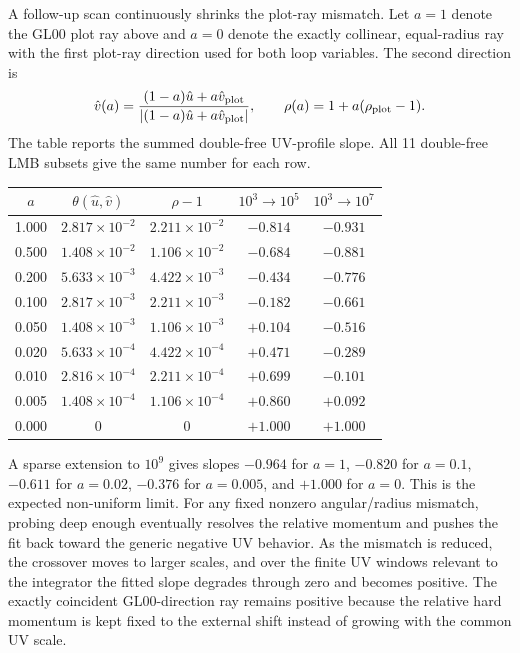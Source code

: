 \documentclass[11pt]{article}
\newcommand{\abs}[1]{\left|#1\right|}
\begin{document}
A follow-up scan continuously shrinks the plot-ray mismatch.  Let $a=1$ denote
the GL00 plot ray above and $a=0$ denote the exactly collinear, equal-radius
ray with the first plot-ray direction used for both loop variables.  The second
direction is
\[
  \hat v(a)=\frac{(1-a)\hat u+a\hat v_{\rm plot}}
                  {\abs{(1-a)\hat u+a\hat v_{\rm plot}}},
  \qquad
  \rho(a)=1+a(\rho_{\rm plot}-1).
\]
The table reports the summed double-free UV-profile slope.  All 11 double-free
LMB subsets give the same number for each row.
\begin{center}
\small
\begin{tabular}{ccccc}
\toprule
$a$ & $\theta(\hat u,\hat v)$ & $\rho-1$ &
$10^3\!\to\!10^5$ & $10^3\!\to\!10^7$ \\
\midrule
1.000 & $2.817\times10^{-2}$ & $2.211\times10^{-2}$ & $-0.814$ & $-0.931$\\
0.500 & $1.408\times10^{-2}$ & $1.106\times10^{-2}$ & $-0.684$ & $-0.881$\\
0.200 & $5.633\times10^{-3}$ & $4.422\times10^{-3}$ & $-0.434$ & $-0.776$\\
0.100 & $2.817\times10^{-3}$ & $2.211\times10^{-3}$ & $-0.182$ & $-0.661$\\
0.050 & $1.408\times10^{-3}$ & $1.106\times10^{-3}$ & $+0.104$ & $-0.516$\\
0.020 & $5.633\times10^{-4}$ & $4.422\times10^{-4}$ & $+0.471$ & $-0.289$\\
0.010 & $2.816\times10^{-4}$ & $2.211\times10^{-4}$ & $+0.699$ & $-0.101$\\
0.005 & $1.408\times10^{-4}$ & $1.106\times10^{-4}$ & $+0.860$ & $+0.092$\\
0.000 & 0 & 0 & $+1.000$ & $+1.000$\\
\bottomrule
\end{tabular}
\end{center}
A sparse extension to $10^9$ gives slopes $-0.964$ for $a=1$, $-0.820$ for
$a=0.1$, $-0.611$ for $a=0.02$, $-0.376$ for $a=0.005$, and $+1.000$ for
$a=0$.  This is the expected non-uniform limit.  For any fixed nonzero
angular/radius mismatch, probing deep enough eventually resolves the relative
momentum and pushes the fit back toward the generic negative UV behavior.  As
the mismatch is reduced, the crossover moves to larger scales, and over the
finite UV windows relevant to the integrator the fitted slope degrades through
zero and becomes positive.  The exactly coincident GL00-direction ray remains
positive because the relative hard momentum is kept fixed to the external
shift instead of growing with the common UV scale.
\end{document}

